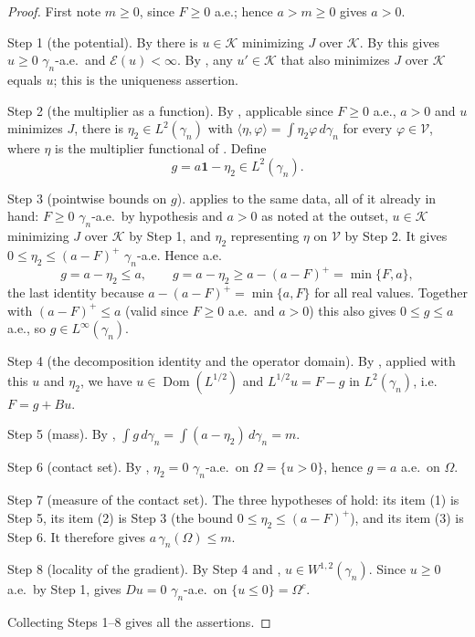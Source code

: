 \begin{proof}
First note $m \geq 0$, since $F \geq 0$ a.e.; hence $a > m \geq 0$ gives $a > 0$.

Step 1 (the potential).  By  there is
$u \in \mathcal{K}$ minimizing $J$ over $\mathcal{K}$.  By
 this gives $u \geq 0$ $\gamma_n$-a.e.\ and
$\mathcal{E}(u) < \infty$.  By , any
$u' \in \mathcal{K}$ that also minimizes $J$ over $\mathcal{K}$ equals $u$; this
is the uniqueness assertion.

Step 2 (the multiplier as a function).  By
, applicable since $F \geq 0$ a.e., $a > 0$
and $u$ minimizes $J$, there is $\eta_2 \in L^2(\gamma_n)$ with
$\langle \eta, \varphi\rangle = \int \eta_2\varphi\, d\gamma_n$ for every
$\varphi \in \mathcal{V}$, where $\eta$ is the multiplier functional of
.  Define
\[
  g = a\mathbf{1} - \eta_2 \in L^2(\gamma_n).
\]

Step 3 (pointwise bounds on $g$).   applies to
the same data, all of it already in hand: $F \geq 0$ $\gamma_n$-a.e.\ by
hypothesis and $a > 0$ as noted at the outset, $u \in \mathcal{K}$ minimizing $J$
over $\mathcal{K}$ by Step 1, and $\eta_2$ representing $\eta$ on $\mathcal{V}$ by
Step 2.  It gives
$0 \leq \eta_2 \leq (a-F)^+$ $\gamma_n$-a.e.  Hence a.e.
\[
  g = a - \eta_2 \leq a,
  \qquad
  g = a - \eta_2 \geq a - (a-F)^+ = \min\{F, a\} ,
\]
the last identity because $a - (a-F)^+ = \min\{a, F\}$ for all real values.
Together with $(a-F)^+ \leq a$ (valid since $F \geq 0$ a.e.\ and $a>0$) this also
gives $0 \leq g \leq a$ a.e., so $g \in L^\infty(\gamma_n)$.

Step 4 (the decomposition identity and the operator domain).  By
, applied with this $u$ and $\eta_2$, we have
$u \in \operatorname{Dom}(L^{1/2})$ and $L^{1/2}u = F - g$ in $L^2(\gamma_n)$,
i.e. $F = g + Bu$.

Step 5 (mass).  By ,
$\int g \, d\gamma_n = \int (a - \eta_2)\, d\gamma_n = m$.

Step 6 (contact set).  By , $\eta_2 = 0$
$\gamma_n$-a.e.\ on $\Omega = \{u>0\}$, hence $g = a$ a.e.\ on $\Omega$.

Step 7 (measure of the contact set).  The three hypotheses of
 hold: its item (1) is Step 5, its item (2) is Step 3
(the bound $0 \leq \eta_2 \leq (a-F)^+$), and its item (3) is Step 6.  It
therefore gives $a\,\gamma_n(\Omega) \leq m$.

Step 8 (locality of the gradient).  By Step 4 and
, $u \in W^{1,2}(\gamma_n)$.  Since $u \geq 0$ a.e.\ by
Step 1,  gives $Du = 0$ $\gamma_n$-a.e.\ on
$\{u \leq 0\} = \Omega^c$.

Collecting Steps 1--8 gives all the assertions.
\end{proof}
